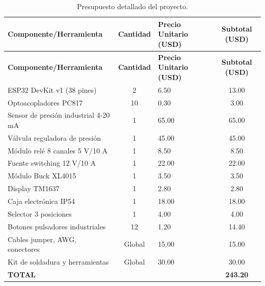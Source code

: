\begin{longtable}{|p{6.5cm}|c|p{2cm}|c|}
\caption{Presupuesto detallado del proyecto.}
\label{tab:presupuesto}
\\\hline
\textbf{Componente/Herramienta} & \textbf{Cantidad} & \textbf{Precio Unitario (USD)} & \textbf{Subtotal (USD)} \\
\hline
\endfirsthead
\hline
\textbf{Componente/Herramienta} & \textbf{Cantidad} & \textbf{Precio Unitario (USD)} & \textbf{Subtotal (USD)} \\
\hline
\endhead
\hline
\endlastfoot
ESP32 DevKit v1 (38 pines) & 2 & 6.50 & 13.00 \\
Optoacopladores PC817 & 10 & 0.30 & 3.00 \\
Sensor de presión industrial 4-20 mA & 1 & 65.00 & 65.00 \\
Válvula reguladora de presión & 1 & 45.00 & 45.00 \\
Módulo relé 8 canales 5 V/10 A & 1 & 8.50 & 8.50 \\
Fuente switching 12 V/10 A & 1 & 22.00 & 22.00 \\
Módulo Buck XL4015 & 1 & 3.50 & 3.50 \\
Display TM1637 & 1 & 2.80 & 2.80 \\
Caja electrónica IP54 & 1 & 18.00 & 18.00 \\
Selector 3 posiciones & 1 & 4.00 & 4.00 \\
Botones pulsadores industriales & 12 & 1.20 & 14.40 \\
Cables jumper, AWG, conectores & Global & 15.00 & 15.00 \\
Kit de soldadura y herramientas & Global & 30.00 & 30.00 \\
\hline
\textbf{TOTAL} & & & \textbf{243.20} \\
\hline
\end{longtable}